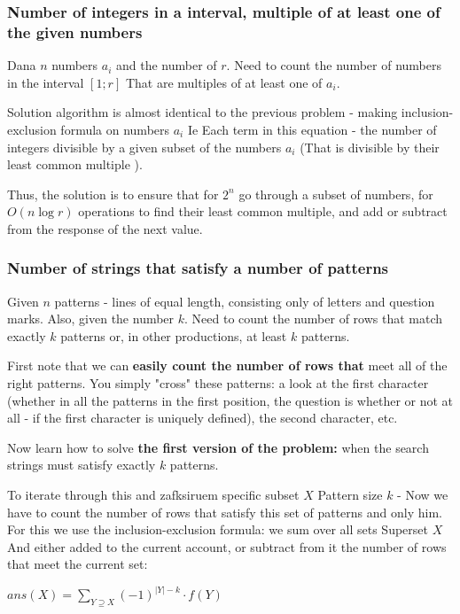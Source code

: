 \subsubsection{ Number of integers in a interval, multiple of at least one of the given numbers }

Dana $n$ numbers $a_i$ and the number of $r$. Need to count the number of numbers in the interval $[1; r]$ That are multiples of at least one of $a_i$.

Solution algorithm is almost identical to the previous problem - making inclusion-exclusion formula on numbers $a_i$ Ie Each term in this equation - the number of integers divisible by a given subset of the numbers $a_i$ (That is divisible by their least common multiple ).

Thus, the solution is to ensure that for $2 ^ n$ go through a subset of numbers, for $O (n \log r)$ operations to find their least common multiple, and add or subtract from the response of the next value.

\subsubsection{ Number of strings that satisfy a number of patterns }

Given $n$ patterns - lines of equal length, consisting only of letters and question marks. Also, given the number $k$. Need to count the number of rows that match exactly $k$ patterns or, in other productions, at least $k$ patterns.

First note that we can \textbf{easily count the number of rows that} meet all of the right patterns. You simply "cross" these patterns: a look at the first character (whether in all the patterns in the first position, the question is whether or not at all - if the first character is uniquely defined), the second character, etc.

Now learn how to solve \textbf{the first version of the problem:} when the search strings must satisfy exactly $k$ patterns.

To iterate through this and zafksiruem specific subset $X$ Pattern size $k$ - Now we have to count the number of rows that satisfy this set of patterns and only him. For this we use the inclusion-exclusion formula: we sum over all sets Superset $X$ And either added to the current account, or subtract from it the number of rows that meet the current set:

$ans(X)=\sum_{Y\supseteq X}(-1)^{|Y|-k}\cdot f(Y)$

